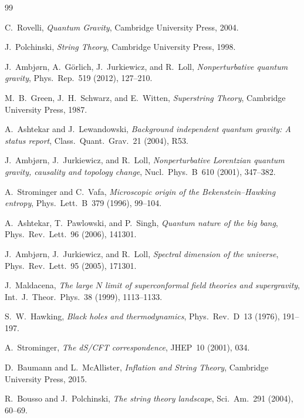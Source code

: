 \documentclass[12pt,a4paper]{article}
\theoremstyle{remark}
\begin{document}
\begin{thebibliography}{99}

C.~Rovelli, \emph{Quantum Gravity}, Cambridge University Press, 2004.

J.~Polchinski, \emph{String Theory}, Cambridge University Press, 1998.

J.~Ambj{\o}rn, A.~G\"orlich, J.~Jurkiewicz, and R.~Loll,
\emph{Nonperturbative quantum gravity}, Phys.~Rep.~519 (2012), 127--210.

M.~B.~Green, J.~H.~Schwarz, and E.~Witten,
\emph{Superstring Theory}, Cambridge University Press, 1987.

A.~Ashtekar and J.~Lewandowski,
\emph{Background independent quantum gravity: A status report},
Class.~Quant.~Grav.~21 (2004), R53.

J.~Ambj{\o}rn, J.~Jurkiewicz, and R.~Loll,
\emph{Nonperturbative Lorentzian quantum gravity, causality and topology change},
Nucl.~Phys.~B~610 (2001), 347--382.

A.~Strominger and C.~Vafa,
\emph{Microscopic origin of the Bekenstein--Hawking entropy},
Phys.~Lett.~B~379 (1996), 99--104.

A.~Ashtekar, T.~Pawlowski, and P.~Singh,
\emph{Quantum nature of the big bang},
Phys.~Rev.~Lett.~96 (2006), 141301.

J.~Ambj{\o}rn, J.~Jurkiewicz, and R.~Loll,
\emph{Spectral dimension of the universe},
Phys.~Rev.~Lett.~95 (2005), 171301.

J.~Maldacena,
\emph{The large $N$ limit of superconformal field theories and supergravity},
Int.~J.~Theor.~Phys.~38 (1999), 1113--1133.

S.~W.~Hawking,
\emph{Black holes and thermodynamics},
Phys.~Rev.~D~13 (1976), 191--197.

A.~Strominger,
\emph{The dS/CFT correspondence},
JHEP~10 (2001), 034.

D.~Baumann and L.~McAllister,
\emph{Inflation and String Theory}, Cambridge University Press, 2015.

R.~Bousso and J.~Polchinski,
\emph{The string theory landscape},
Sci.~Am.~291 (2004), 60--69.


\end{thebibliography}
\end{document}
